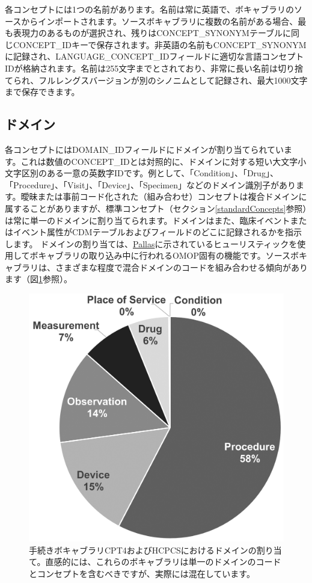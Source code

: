 \documentclass[
  11pt]{book}
\theoremstyle{definition}
\theoremstyle{definition}
\theoremstyle{definition}
\theoremstyle{definition}
\theoremstyle{remark}
\begin{document}
各コンセプトには1つの名前があります。名前は常に英語で、ボキャブラリのソースからインポートされます。ソースボキャブラリに複数の名前がある場合、最も表現力のあるものが選択され、残りはCONCEPT\_SYNONYMテーブルに同じCONCEPT\_IDキーで保存されます。非英語の名前もCONCEPT\_SYNONYMに記録され、LANGUAGE\_CONCEPT\_IDフィールドに適切な言語コンセプトIDが格納されます。名前は255文字までとされており、非常に長い名前は切り捨てられ、フルレングスバージョンが別のシノニムとして記録され、最大1000文字まで保存できます。

\subsection{ドメイン}\label{conceptDomains}

各コンセプトにはDOMAIN\_IDフィールドにドメインが割り当てられています。これは数値のCONCEPT\_IDとは対照的に、ドメインに対する短い大文字小文字区別のある一意の英数字IDです。例として、「Condition」、「Drug」、「Procedure」、「Visit」、「Device」、「Specimen」などのドメイン識別子があります。曖昧または事前コード化された（組み合わせ）コンセプトは複合ドメインに属することがありますが、標準コンセプト（セクション\ref{standardConcepts}参照）は常に単一のドメインに割り当てられます。ドメインはまた、臨床イベントまたはイベント属性がCDMテーブルおよびフィールドのどこに記録されるかを指示します。
ドメインの割り当ては、\href{https://github.com/ohDSI/vocabulary-v5.0}{Pallas}に示されているヒューリスティックを使用してボキャブラリの取り込み中に行われるOMOP固有の機能です。ソースボキャブラリは、さまざまな程度で混合ドメインのコードを組み合わせる傾向があります（図\ref{fig:domains}参照）。

\begin{figure}

{\centering \includegraphics[width=0.7\linewidth]{images/StandardizedVocabularies/domains} 

}

\caption{手続きボキャブラリCPT4およびHCPCSにおけるドメインの割り当て。直感的には、これらのボキャブラリは単一のドメインのコードとコンセプトを含むべきですが、実際には混在しています。}\label{fig:domains}
\end{figure}
\end{document}
